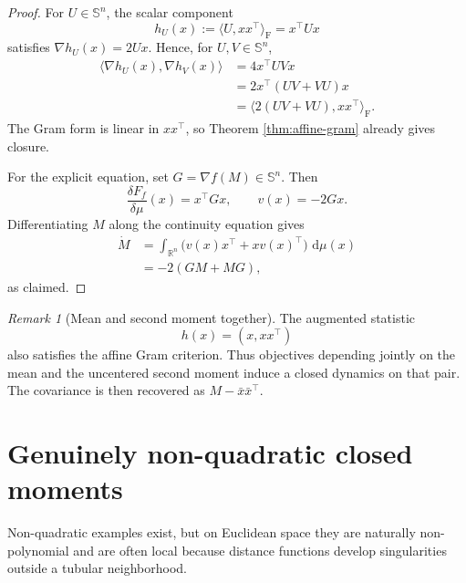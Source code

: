 \documentclass[11pt]{article}
\newcommand{\R}{\mathbb R}
\newcommand{\Sym}{\mathbb S}
\newcommand{\dd}{\,\mathrm d}
\theoremstyle{remark}
\newtheorem{remark}{Remark}
\begin{document}
\begin{proof}
For \(U\in\Sym^n\), the scalar component
\[
  h_U(x):=\langle U,xx^\top\rangle_{\mathrm F}=x^\top Ux
\]
satisfies \(\nabla h_U(x)=2Ux\).  Hence, for \(U,V\in\Sym^n\),
\[
  \begin{aligned}
  \langle\nabla h_U(x),\nabla h_V(x)\rangle
  &=
  4x^\top UVx\\
  &=
  2x^\top(UV+VU)x\\
  &=
  \langle2(UV+VU),xx^\top\rangle_{\mathrm F}.
  \end{aligned}
\]
The Gram form is linear in \(xx^\top\), so Theorem
\ref{thm:affine-gram} already gives closure.

For the explicit equation, set \(G=\nabla f(M)\in\Sym^n\).  Then
\[
  \frac{\delta F_f}{\delta\mu}(x)=x^\top Gx,
  \qquad
  v(x)=-2Gx.
\]
Differentiating \(M\) along the continuity equation gives
\[
  \begin{aligned}
  \dot M
  &=
  \int_{\R^n}\bigl(v(x)x^\top+xv(x)^\top\bigr)\,\dd\mu(x)\\
  &=
  -2(GM+MG),
  \end{aligned}
\]
as claimed.
\end{proof}

\begin{remark}[Mean and second moment together]
The augmented statistic
\[
  h(x)=(x,xx^\top)
\]
also satisfies the affine Gram criterion.  Thus objectives depending jointly
on the mean and the uncentered second moment induce a closed dynamics on
that pair.  The covariance is then recovered as
\(M-\bar x\bar x^\top\).
\end{remark}

\section{Genuinely non-quadratic closed moments}

Non-quadratic examples exist, but on Euclidean space they are naturally
non-polynomial and are often local because distance functions develop
singularities outside a tubular neighborhood.
\end{document}
